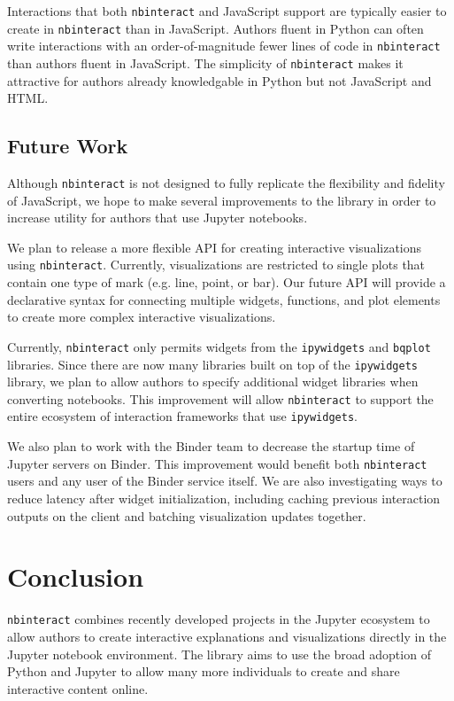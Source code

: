 \documentclass[nobib]{tufte-handout}
\newcommand{\code}[1]{\texttt{#1}}
\begin{document}
Interactions that both \code{nbinteract} and JavaScript support are typically
easier to create in \code{nbinteract} than in JavaScript. Authors fluent in
Python can often write interactions with an order-of-magnitude fewer lines of
code in \code{nbinteract} than authors fluent in JavaScript. The simplicity of
\code{nbinteract} makes it attractive for authors already knowledgable in
Python but not JavaScript and HTML.


\subsection{Future Work} %
\label{sub:future_work}

Although \code{nbinteract} is not designed to fully replicate the flexibility
and fidelity of JavaScript, we hope to make several improvements to the library
in order to increase utility for authors that use Jupyter notebooks.

We plan to release a more flexible API for creating interactive visualizations
using \code{nbinteract}. Currently, visualizations are restricted to single
plots that contain one type of mark (e.g. line, point, or bar). Our future API
will provide a declarative syntax for connecting multiple widgets, functions,
and plot elements to create more complex interactive visualizations.

Currently, \code{nbinteract} only permits widgets from the \code{ipywidgets}
and \code{bqplot} libraries. Since there are now many libraries built on top of
the \code{ipywidgets} library, we plan to allow authors to
specify additional widget libraries when converting notebooks. This improvement
will allow \code{nbinteract} to support the entire ecosystem of interaction
frameworks that use \code{ipywidgets}.

We also plan to work with the Binder team to decrease the startup time of
Jupyter servers on Binder. This improvement would benefit both
\code{nbinteract} users and any user of the Binder service itself. We are also
investigating ways to reduce latency after widget initialization, including
caching previous interaction outputs on the client and batching visualization
updates together.



\section{Conclusion} %
\label{sec:conclusion}

\code{nbinteract} combines recently developed projects in the Jupyter ecosystem
to allow authors to create interactive explanations and visualizations directly
in the Jupyter notebook environment. The library aims to use the broad adoption
of Python and Jupyter to allow many more individuals to create and share
interactive content online.


\newpage

\printbibliography
\end{document}
